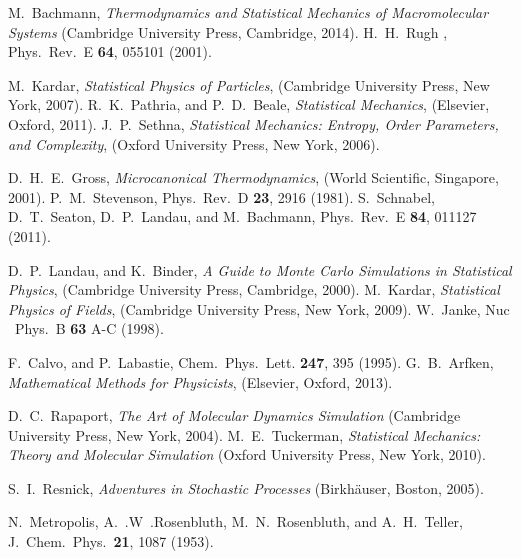 M.~Bachmann, \emph{Thermodynamics and Statistical Mechanics of
Macromolecular Systems}  (Cambridge University Press, Cambridge,
2014).
%
H.~H.~Rugh , Phys.\ Rev.~E \textbf{64},
055101 (2001).


M.~Kardar, \emph{Statistical Physics of Particles}, (Cambridge University Press, New York, 2007).
%
R.~K.~Pathria, and P.~D.~Beale, \emph{Statistical Mechanics}, (Elsevier, Oxford, 2011).
%
J.~P.~Sethna, \emph{Statistical Mechanics: Entropy, Order Parameters, and Complexity}, 
(Oxford University Press, New York, 2006).
%


D.~H.~E.~Gross, \emph{Microcanonical Thermodynamics}, (World Scientific, Singapore,  2001).
%
P.~M.~Stevenson, Phys.\ Rev.~D \textbf{23}, 2916 (1981).
%
S.~Schnabel, D.~T.\ Seaton, D.~P.\ Landau, and M.~Bachmann, Phys.\ Rev.~E
\textbf{84}, 011127 (2011). 
%



D.~P.\ Landau, and K.~Binder, \emph{A Guide to Monte Carlo Simulations in Statistical Physics}, (Cambridge University Press, Cambridge, 2000).
%
M.~Kardar, \emph{Statistical Physics of Fields}, (Cambridge University Press, New York, 2009).
%
W.~Janke, Nuc \ Phys.~B \textbf{63} A-C (1998).

F.~Calvo, and P.~Labastie,  Chem.\ Phys.\ Lett. \textbf{247}, 395 (1995).
%
G.~B.~Arfken, \emph{Mathematical Methods for Physicists},  (Elsevier, Oxford, 2013).

D.~C.~Rapaport,  \emph{The Art of Molecular Dynamics Simulation}  (Cambridge University Press, New York,
2004).
M.~E.~Tuckerman, \emph{Statistical Mechanics: Theory and Molecular Simulation} (Oxford University Press, New York, 2010).

S.~I.~Resnick, \emph{Adventures in Stochastic Processes} (Birkh{\"a}user, Boston, 2005).

N.~Metropolis, A.~.W~.Rosenbluth, M.~N.~Rosenbluth, and A.~H.~Teller,   J.~Chem.\ Phys.\
\textbf{21}, 1087 (1953).

